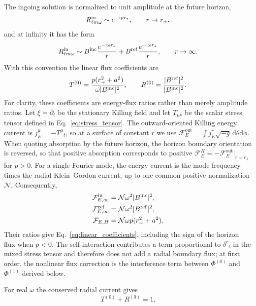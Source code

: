\documentclass[aps,prd,twocolumn,10pt,nofootinbib,superscriptaddress,floatfix]{revtex4-2}
\newcommand{\dd}{\mathrm{d}}
\newcommand{\ii}{\mathrm{i}}
\newcommand{\rp}{r_+}
\newcommand{\Bin}{B^{\rm inc}}
\newcommand{\Bref}{B^{\rm ref}}
\begin{document}
The ingoing solution is normalized to unit amplitude at the future horizon,
\begin{equation}
R^{\rm in}_{\ell m\omega}\sim e^{-\ii p r_*},\qquad r\rightarrow\rp ,
\label{eq:bc_hor}
\end{equation}
and at infinity it has the form
\begin{equation}
R^{\rm in}_{\ell m\omega}\sim
\Bin\frac{e^{-\ii\omega r_*}}{r}
+\Bref\frac{e^{+\ii\omega r_*}}{r},
\qquad r\rightarrow\infty .
\label{eq:bc_inf}
\end{equation}
With this convention the linear flux coefficients are
\begin{equation}
T^{(0)}=
\frac{p(\rp^2+a^2)}{\omega|\Bin|^2},
\qquad
R^{(0)}=\frac{|\Bref|^2}{|\Bin|^2}.
\label{eq:linear_coefficients}
\end{equation}
For clarity, these coefficients are energy-flux ratios rather than merely
amplitude ratios.  Let $\xi=\partial_t$ be the stationary Killing field and
let $T_{\mu\nu}$ be the scalar stress tensor defined in
Eq.~\eqref{eq:stress_tensor}.  The outward-oriented Killing energy current is
$j_E^\mu=-T^\mu{}_t$, so at a surface of constant $r$ we use
$\mathcal F_E^\mathrm{out}=\int j_E^r\sqrt{-g}\,\dd\theta\dd\phi$.
When quoting absorption by the future horizon, the horizon boundary
orientation is reversed, so that positive absorption corresponds to positive
$\mathcal F_E^H=-\mathcal F_E^\mathrm{out}|_{r=r_+}$ for $p>0$.
For a single Fourier mode, the energy current is the mode frequency times
the radial Klein--Gordon current, up to one common positive normalization
$\mathcal N$.  Consequently,
\begin{equation}
\begin{aligned}
\mathcal F_{E,\infty}^{\rm in}&=\mathcal N\omega^2|B^{\rm inc}|^2,\\
\mathcal F_{E,\infty}^{\rm ref}&=\mathcal N\omega^2|B^{\rm ref}|^2,\\
\mathcal F_{E,H}&=\mathcal N\omega p(r_+^2+a^2).
\end{aligned}
\label{eq:mode_fluxes}
\end{equation}
Their ratios give
Eq.~\eqref{eq:linear_coefficients}, including the sign of the horizon flux
when $p<0$.  The self-interaction contributes a term proportional to
$\delta^r{}_t$ in the mixed stress tensor and therefore does not add a radial
boundary flux; at first order, the nonlinear flux correction is the
interference term between $\Phi^{(0)}$ and $\Phi^{(1)}$ derived below.

For real $\omega$ the conserved radial current gives
\begin{equation}
T^{(0)}+R^{(0)}=1 .
\label{eq:linear_balance}
\end{equation}
\end{document}
